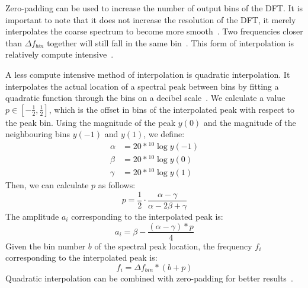 \documentclass[10pt,twocolumn]{article}
\begin{document}
Zero-padding can be used to increase the number of output bins of the DFT. It is important to note that it does not increase the resolution of the DFT, it merely interpolates the coarse spectrum to become more smooth~\cite{zeropad1}. Two frequencies closer than $\Delta f_{bin}$ together will still fall in the same bin~\cite{zeropad2}. This form of interpolation is relatively compute intensive~\cite{interpolnozero}.

A less compute intensive method of interpolation is quadratic interpolation. It interpolates the actual location of a spectral peak between bins by fitting a quadratic function through the bins on a decibel scale~\cite{dbpolate, interpol}. We calculate a value $p \in [-\frac{1}{2}, \frac{1}{2}]$, which is the offset in bins of the interpolated peak with respect to the peak bin. Using the magnitude of the peak $y(0)$ and the magnitude of the neighbouring bins $y(-1)$ and $y(1)$, we define:
\begin{align*}
    \alpha &= 20 * {}^{10}\!\log{y(-1)} \\
    \beta  &= 20 * {}^{10}\!\log{y(0)} \\
    \gamma &= 20 * {}^{10}\!\log{y(1)}
\end{align*}
Then, we can calculate $p$ as follows:
\[ p = \frac{1}{2} \cdot \frac{\alpha - \gamma}{\alpha - 2\beta + \gamma} \]
The amplitude $a_i$ corresponding to the interpolated peak is:
\[ a_i = \beta - \frac{(\alpha - \gamma) * p}{4} \]
Given the bin number $b$ of the spectral peak location, the frequency $f_i$ corresponding to the interpolated peak is:
\[ f_i = \Delta f_{bin} * (b + p) \]
Quadratic interpolation can be combined with zero-padding for better results~\cite{interpolnozero}.
\end{document}

